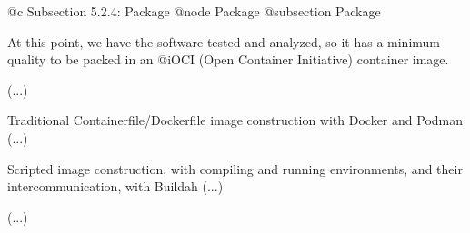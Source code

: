 @c Subsection 5.2.4: Package
@node Package
@subsection Package

At this point, we have the software tested and analyzed, so it has a minimum quality to be packed in an @i{OCI (Open Container Initiative)} container image.

(...)

Traditional Containerfile/Dockerfile image construction with Docker and Podman (...)

Scripted image construction, with compiling and running environments, and their intercommunication, with Buildah (...)

(...)
